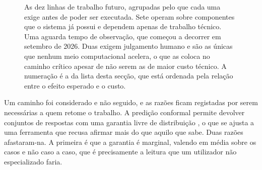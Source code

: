 \begin{figure}[htbp]
\centering
{}
\caption[As linhas futuras, por aquilo que as desbloqueia]{As dez linhas de trabalho futuro,
agrupadas pelo que cada uma exige antes de poder ser executada. Sete operam sobre componentes que
o sistema já possui e dependem apenas de trabalho técnico. Uma aguarda tempo de observação, que
começou a decorrer em setembro de 2026. Duas exigem julgamento humano e são as únicas que nenhum
meio computacional acelera, o que as coloca no caminho crítico apesar de não serem as de maior
custo técnico. A numeração é a da lista desta secção, que está ordenada pela relação entre o
efeito esperado e o custo.}
\label{fig:con_futuro}
\end{figure}

Um caminho foi considerado e não seguido, e as razões ficam registadas por serem necessárias a quem
retome o trabalho. A predição conformal permite devolver conjuntos de respostas com uma garantia
livre de distribuição \autocite{vovk2005algorithmic, angelopoulos2023conformal}, o que se ajusta a
uma ferramenta que recusa afirmar mais do que aquilo que sabe. Duas razões afastaram-na. A primeira é
que a garantia é marginal, valendo em média sobre os casos e não caso a caso, que é precisamente a
leitura que um utilizador não especializado faria.

